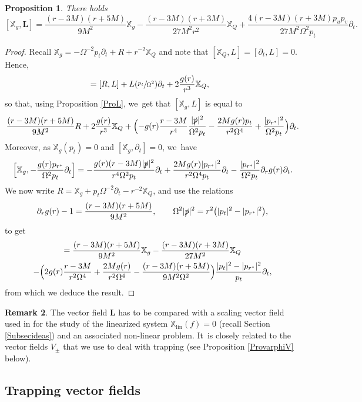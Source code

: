 \documentclass[JEP,XML,SOM,Unicode,published]{cedram}
\theoremstyle{plain}
\newtheorem{proposition}{Proposition}[section]
\theoremstyle{definition}
\newtheorem{remark}[proposition]{Remark}
\newcommand\T{{\mathbb{X}}}
\begin{document}
\begin{proposition}\label{ProbarY}
There holds
\[
[\T_g,\pmb{L}] = \frac{(r-3M)(r+5M)}{9M^2}\T_g-\frac{(r-3M)(r+3M)}{27M^2r^2}\T_Q+\frac{4(r-3M)(r+3M)p_u p_v}{27M^2 \Omega^2p_t} \partial_t.
\]
\end{proposition}
\begin{proof}
Recall $\T_g=-\Omega^{-2}p_t\partial_t+R+r^{-2}\T_Q$ and note that $[\T_Q,L]=[\partial_t,L]=0$. Hence,
\begin{align*}
[\T_g,L] & = [R,L]+L(\sfrac{p_t}{\Omega^2})\partial_t+2\frac{g(r)}{r^3} \T_Q,
\end{align*}
so that, using Proposition \ref{ProL}, we~get that $[\T_g,L]$ is equal to
\[
\frac{(r-3M)(r+5M)}{9M^2}R+2\frac{g(r)}{r^3}\T_Q+\Bigl(-g(r)\frac{r-3M}{r^4}\frac{|\slashed{p}|^2}{\Omega^2 p_t}-\frac{2Mg(r)p_t}{r^2\Omega^4}+\frac{|p_{r^*}|^2}{\Omega^2p_t}\Bigr) \partial_t.
\]
Moreover, as $\T_g(p_t)=0$ and $[\T_g, \partial_t]=0$, we~have
\[
\Bigl[ \T_g, -\frac{g(r)p_{r^*}}{\Omega^2p_t} \partial_t \Bigr] = -\frac{g(r)(r-3M)|\slashed{p}|^2}{r^4\Omega^2p_t} \partial_t +\frac{2Mg(r)|p_{r^*}|^2}{r^2\Omega^4p_t} \partial_t-\frac{|p_{r^*}|^2}{ \Omega^2 p_t} \partial_r g(r) \partial_t.
\]
We now write $R=\T_g+p_t \Omega^{-2} \partial_t-r^{-2} \T_Q$, and use the relations
\[
\partial_r g(r)-1=\frac{(r-3M)(r+5M)}{9M^2},\qquad \Omega^2 |\slashed{p}|^2=r^2 \bigl(|p_t|^2-|p_{r^*}|^2 \bigr),
\]
to get
\begin{multline*}
[\T_g,\pmb{L}] = \frac{(r-3M)(r+5M)}{9M^2}\T_g-\frac{(r-3M)(r+3M)}{27M^2}\T_Q\\
-\Bigl(2g(r)\frac{r-3M}{r^2 \Omega^4} +\frac{2Mg(r)}{r^2\Omega^4}-\frac{(r-3M)(r+5M)}{9M^2 \Omega^2} \Bigr)\frac{|p_t|^2-|p_{r^*}|^2}{p_t} \partial_t,
\end{multline*}
from which we deduce the result.
\end{proof}

\begin{remark}
The vector field $\pmb{L}$ has to be compared with a scaling vector field used in \cite{VV24} for the study of the linearized system $\mathbb{X}_{\mathrm{lin}}(f)=0$ (recall Section \ref{Subsecideas}) and an associated non-linear problem. It~is closely related to the vector fields $V_{\pm}$ that we use to deal with trapping (see Proposition \ref{ProvarphiV} below).
\end{remark}

\subsection{Trapping vector fields}\label{SubsecVminus}
\end{document}
